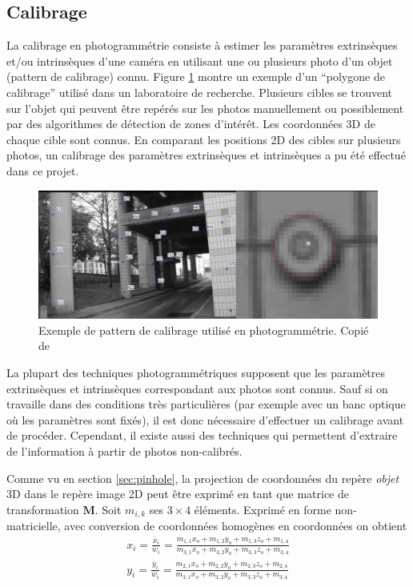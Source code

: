 \documentclass[a4paper,10pt]{scrreprt}
\begin{document}
\subsection{Calibrage}
La calibrage en photogrammétrie consiste à estimer les paramètres extrinsèques et/ou intrinsèques d'une caméra en utilisant une ou plusieurs photo d'un objet (pattern de calibrage) connu. \cite{Truc1998} Figure \ref{fig:calibration_pattern} montre un exemple d'un ``polygone de calibrage'' utilisé dans un laboratoire de recherche. \cite{Gard2009} Plusieurs cibles se trouvent sur l'objet qui peuvent être repérés sur les photos manuellement ou possiblement par des algorithmes de détection de zones d'intérêt. Les coordonnées 3D de chaque cible sont connus. En comparant les positions 2D des cibles sur plusieurs photos, un calibrage des paramètres extrinsèques et intrinsèques a pu été effectué dans ce projet.

\begin{figure}[p]
\includegraphics[width=\textwidth]{calibration_pattern.png}
\caption{Exemple de pattern de calibrage utilisé en photogrammétrie. Copié de \cite{Gard2009}}
\label{fig:calibration_pattern}
\end{figure}

La plupart des techniques photogrammétriques supposent que les paramètres extrinsèques et intrinsèques correspondant aux photos sont connus. Sauf si on travaille dans des conditions très particulières (par exemple avec un banc optique où les paramètres sont fixés), il est donc nécessaire d'effectuer un calibrage avant de procéder. Cependant, il existe aussi des techniques qui permettent d'extraire de l'information à partir de photos non-calibrés. \cite{Truc1998}

Comme vu en section \ref{sec:pinhole}, la projection de coordonnées du repère \emph{objet} 3D dans le repère image 2D peut être exprimé en tant que matrice de transformation $\mathbf{M}$. Soit $m_{i,k}$ ses $3 \times 4$ éléments. Exprimé en forme non-matricielle, avec conversion de coordonnées homogènes en coordonnées on obtient
\begin{equation*}
\begin{gathered}
	x_i = \frac{\ddot{x_i}}{\ddot{w_i}} = \frac
		{m_{1,1} x_o + m_{1,2} y_o + m_{1,3} z_o + m_{1,4}}
		{m_{3,1} x_o + m_{3,2} y_o + m_{3,3} z_o + m_{3,4}} \\
	y_i = \frac{\ddot{y_i}}{\ddot{w_i}} = \frac
		{m_{2,1} x_o + m_{2,2} y_o + m_{2,3} z_o + m_{2,4}}
		{m_{3,1} x_o + m_{3,2} y_o + m_{3,3} z_o + m_{3,4}}
\end{gathered}
\end{equation*}
\end{document}
